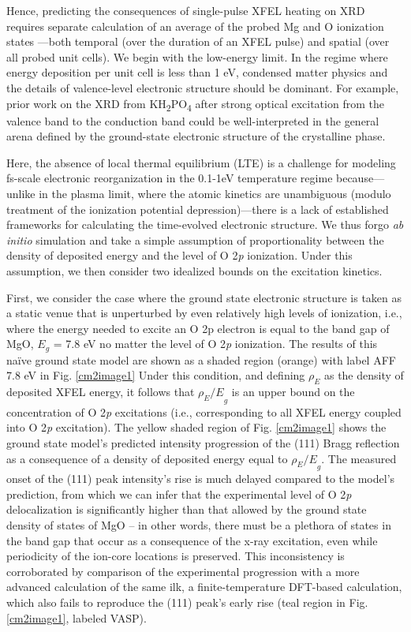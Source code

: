 Hence, predicting the consequences of single-pulse XFEL heating on XRD
requires separate calculation of an average of the probed Mg and O
ionization states ---both temporal (over the duration of an XFEL pulse)
and spatial (over all probed unit cells). We begin with the low-energy
limit. In the regime where energy deposition per unit cell is less than
1 eV, condensed matter physics and the details of valence-level
electronic structure should be dominant. For example, prior work on the
XRD from KH\textsubscript{2}PO\textsubscript{4} after strong optical
excitation from the valence band to the conduction band could be
well-interpreted in the general arena defined by the ground-state
electronic structure of the crystalline phase. \cite{zamponi2012ultrafast}

Here, the absence of local thermal equilibrium (LTE) is a challenge for
modeling fs-scale electronic reorganization in the 0.1-1eV temperature
regime because---unlike in the plasma limit, where the atomic kinetics
are unambiguous (modulo treatment of the ionization potential
depression)---there is a lack of established frameworks for calculating
the time-evolved electronic structure. We thus forgo \emph{ab initio}
simulation and take a simple assumption of proportionality between the
density of deposited energy and the level of O 2\emph{p} ionization.
Under this assumption, we then consider two idealized bounds on the
excitation kinetics.

First, we consider the case where the ground state electronic structure
is taken as a static venue that is unperturbed by even relatively high
levels of ionization, i.e., where the energy needed to excite an O 2p
electron is equal to the band gap of MgO, \(E_{g}\) = 7.8 eV no matter
the level of O 2\emph{p} ionization. The results of this naïve ground
state model are shown as a shaded region (orange) with label AFF 7.8 eV
in Fig. \ref{cm2image1} Under this condition, and defining \(\rho_{E}\) as the
density of deposited XFEL energy, it follows that \({\rho_{E}/E}_{g}\)
is an upper bound on the concentration of O 2\emph{p} excitations (i.e.,
corresponding to all XFEL energy coupled into O 2\emph{p} excitation).
The yellow shaded region of Fig. \ref{cm2image1} shows the ground state model's
predicted intensity progression of the (111) Bragg reflection as a
consequence of a density of deposited energy equal to
\({\rho_{E}/E}_{g}.\) The measured onset of the (111) peak intensity's
rise is much delayed compared to the model's prediction, from which we
can infer that the experimental level of O 2\emph{p} delocalization is
significantly higher than that allowed by the ground state density of
states of MgO -- in other words, there must be a plethora of states in
the band gap that occur as a consequence of the x-ray excitation, even
while periodicity of the ion-core locations is preserved. This
inconsistency is corroborated by comparison of the experimental
progression with a more advanced calculation of the same ilk, a
finite-temperature DFT-based calculation, which also fails to reproduce
the (111) peak's early rise (teal region in Fig. \ref{cm2image1}, labeled VASP).

